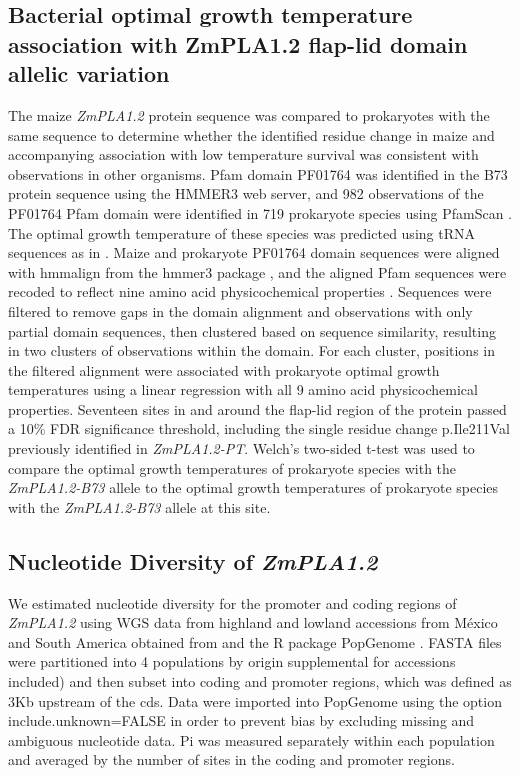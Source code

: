 \documentclass[9pt,twocolumn,twoside]{BioRxiv}
\begin{document}
\subsection{Bacterial optimal growth temperature association with ZmPLA1.2 flap-lid domain allelic variation}
The maize \textit{ZmPLA1.2} protein sequence was compared to prokaryotes with the same sequence to determine whether the identified residue change in maize and accompanying association with low temperature survival was consistent with observations in other organisms. 
Pfam domain PF01764 was identified in the B73 protein sequence using the HMMER3 web server, and 982 observations of the PF01764 Pfam domain were identified in 719 prokaryote species using PfamScan \cite{Potter2018-tk, El-Gebali2019-pw}. 
The optimal growth temperature of these species was predicted using tRNA sequences as in \cite{Cimen2020-dm}. 
Maize and prokaryote PF01764 domain sequences were aligned with hmmalign from the hmmer3 package \cite{Eddy2011-pd}, and the aligned Pfam sequences were recoded to reflect nine amino acid physicochemical properties \cite{Li2016-ut}. 
Sequences were filtered to remove gaps in the domain alignment and observations with only partial domain sequences, then clustered based on sequence similarity, resulting in two clusters of observations within the domain. 
For each cluster, positions in the filtered alignment were associated with prokaryote optimal growth temperatures using a linear regression with all 9 amino acid physicochemical properties. 
Seventeen sites in and around the flap-lid region of the protein passed a 10\% FDR significance threshold, including the single residue change p.Ile211Val previously identified in \textit{ZmPLA1.2-PT}. 
Welch’s two-sided t-test was used to compare the optimal growth temperatures of prokaryote species with the \textit{ZmPLA1.2-B73} allele to the optimal growth temperatures of prokaryote species with the \textit{ZmPLA1.2-B73} allele at this site.

\subsection{Nucleotide Diversity of \textit{ZmPLA1.2} }
We estimated nucleotide diversity for the promoter and coding regions of \textit{ZmPLA1.2} using WGS data from highland and lowland accessions from México and South America obtained from \cite{Wang2017-bc} and the R package PopGenome \cite{Pfeifer2014-bg}. 
FASTA files were partitioned into 4 populations by origin  supplemental for accessions included) and then subset into coding and promoter regions, which was defined as 3Kb upstream of the cds. 
Data were imported into PopGenome using the option include.unknown=FALSE in order to prevent bias by excluding missing and ambiguous nucleotide data.
Pi was measured separately within each population and averaged by the number of sites in the coding and promoter regions. 
\end{document}
